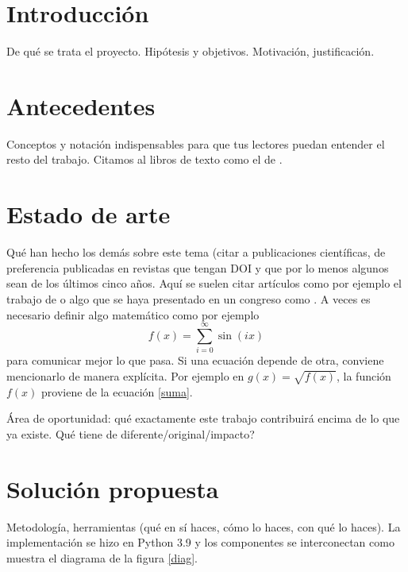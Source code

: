 \documentclass[a0]{sciposter} %
\begin{document}
\begin{multicols}{2} 

\section{Introducción}

De qué se trata el proyecto. Hipótesis y objetivos. Motivación,
justificación.

\section{Antecedentes}

Conceptos y notación indispensables para que tus lectores puedan
entender el resto del trabajo. Citamos al libros de texto como el de
\citet{ai}.

\section{Estado de arte}

Qué han hecho los demás sobre este tema (citar a publicaciones
científicas, de preferencia publicadas en revistas que tengan DOI y
que por lo menos algunos sean de los últimos cinco años. Aquí se
suelen citar artículos como por ejemplo el trabajo de \citet{elisa} o
algo que se haya presentado en un congreso como \citet{ar}. A veces es
necesario definir algo matemático como por ejemplo
\begin{equation}
    f(x) = \sum_{i = 0}^\infty \sin(i x)
    \label{suma}
\end{equation}
para comunicar mejor lo que pasa. Si una ecuación depende de otra,
conviene mencionarlo de manera explícita.  Por ejemplo en $g(x) =
\sqrt{f(x)}$, la función $f(x)$ proviene de la ecuación \eqref{suma}.

Área de oportunidad: qué exactamente este trabajo contribuirá encima
de lo que ya existe.  {\textquestiondown}Qué tiene de
diferente/original/impacto?

\section{Solución propuesta}

Metodología, herramientas (qué en sí haces, cómo lo haces, con qué lo
haces).  La implementación se hizo en Python 3.9 \citep{python} y los
componentes se interconectan como muestra el diagrama de la figura
\ref{diag}.


\end{multicols}
\end{document}
